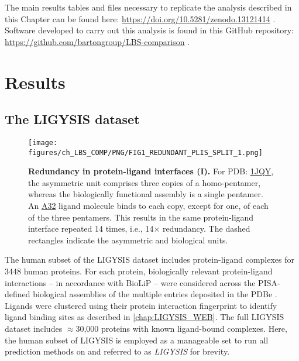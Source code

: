 The main results tables and files necessary to replicate the analysis described in this Chapter can be found here: \url{https://doi.org/10.5281/zenodo.13121414} \cite{UTGES_2024_LBSCOMP_ZENODO}. Software developed to carry out this analysis is found in this GitHub repository: \url{https://github.com/bartongroup/LBS-comparison} \cite{UTGES_2024_LBSCOMP_REPO}.

\section{Results}

\subsection{The LIGYSIS dataset}

\begin{figure}[htb!]
    \centering
    \texttt{[image: figures/ch\_LBS\_COMP/PNG/FIG1\_REDUNDANT\_PLIS\_SPLIT\_1.png]}
    \caption[Redundancy in protein-ligand interfaces (I)]{\textbf{Redundancy in protein-ligand interfaces (I).} For PDB: \href{https://www.ebi.ac.uk/pdbe/entry/pdb/1jqy}{1JQY}, the asymmetric unit comprises three copies of a homo-pentamer, whereas the biologically functional assembly is a single pentamer. An \href{https://www.ebi.ac.uk/pdbe-srv/pdbechem/chemicalCompound/show/A32}{A32} ligand molecule binds to each copy, except for one, of each of the three pentamers. This results in the same protein-ligand interface repeated 14 times, i.e., 14$\times$ redundancy. The dashed rectangles indicate the asymmetric and biological units.}
    \label{fig:redundant_plis_1}
\end{figure}

The human subset of the LIGYSIS dataset includes protein-ligand complexes for 3448 human proteins. For each protein, biologically relevant protein-ligand interactions -- in accordance with BioLiP \cite{YANG_2013_BIOLIP} -- were considered across the PISA-defined \cite{KRISSINEL_2007_PISA} biological assemblies of the multiple entries deposited in the PDBe \cite{ARMSTRONG_2020_PDBE}. Ligands were clustered using their protein interaction fingerprint to identify ligand binding sites as described in \autoref{chap:LIGYSIS_WEB}. The full LIGYSIS dataset includes $\approx$30,000 proteins with known ligand-bound complexes. Here, the human subset of LIGYSIS is employed as a manageable set to run all prediction methods on and referred to as \textit{LIGYSIS} for brevity.

